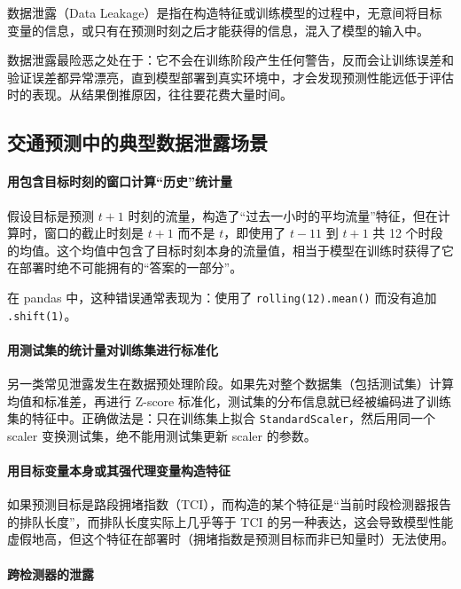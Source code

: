 数据泄露（Data Leakage）是指在构造特征或训练模型的过程中，无意间将目标变量的信息，或只有在预测时刻之后才能获得的信息，混入了模型的输入中。

数据泄露最险恶之处在于：它不会在训练阶段产生任何警告，反而会让训练误差和验证误差都异常漂亮，直到模型部署到真实环境中，才会发现预测性能远低于评估时的表现。从结果倒推原因，往往要花费大量时间。

\subsection{交通预测中的典型数据泄露场景}

\paragraph{用包含目标时刻的窗口计算“历史”统计量}

假设目标是预测 $t+1$ 时刻的流量，构造了“过去一小时的平均流量”特征，但在计算时，窗口的截止时刻是 $t+1$ 而不是 $t$，即使用了 $t-11$ 到 $t+1$ 共 12 个时段的均值。这个均值中包含了目标时刻本身的流量值，相当于模型在训练时获得了它在部署时绝不可能拥有的“答案的一部分”。

在 pandas 中，这种错误通常表现为：使用了 \texttt{rolling(12).mean()} 而没有追加 \texttt{.shift(1)}。

\paragraph{用测试集的统计量对训练集进行标准化}

另一类常见泄露发生在数据预处理阶段。如果先对整个数据集（包括测试集）计算均值和标准差，再进行 Z-score 标准化，测试集的分布信息就已经被编码进了训练集的特征中。正确做法是：只在训练集上拟合 \texttt{StandardScaler}，然后用同一个 scaler 变换测试集，绝不能用测试集更新 scaler 的参数。

\paragraph{用目标变量本身或其强代理变量构造特征}

如果预测目标是路段拥堵指数（TCI），而构造的某个特征是“当前时段检测器报告的排队长度”，而排队长度实际上几乎等于 TCI 的另一种表达，这会导致模型性能虚假地高，但这个特征在部署时（拥堵指数是预测目标而非已知量时）无法使用。

\paragraph{跨检测器的泄露}

